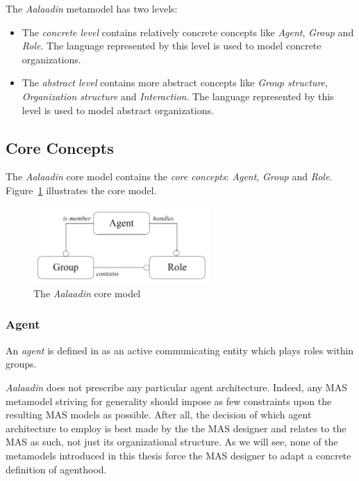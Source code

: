 The \textit{Aalaadin} metamodel has two levels:
\begin{itemize}
	\item The \textit{concrete level} contains relatively concrete concepts like \textit{Agent}, \textit{Group} and \textit{Role}.
	The language represented by this level is used to model concrete organizations.
	\item The \textit{abstract level} contains more abstract concepts like \textit{Group structure}, \textit{Organization structure} and \textit{Interaction}.
	The language represented by this level is used to model abstract organizations.
\end{itemize}

\subsection{Core Concepts}

The \textit{Aalaadin} core model contains the \textit{core concepts}: \textit{Agent}, \textit{Group} and \textit{Role}.
Figure~\ref{figure:aalaadin-core-model} illustrates the core model.

\begin{figure}[h]
	\centering
	\includegraphics[width=0.6\textwidth]{images/aalaadin/core-model.png}
	\caption{The \textit{Aalaadin} core model \cite{Ferber97}}
	\label{figure:aalaadin-core-model}
\end{figure}

\subsubsection*{Agent}

An \textit{agent} is defined in \cite{Ferber97} as an active communicating entity which plays roles within groups.

\textit{Aalaadin} does not prescribe any particular agent architecture.
Indeed, any MAS metamodel striving for generality should impose as few constraints upon the resulting MAS models as possible.
After all, the decision of which agent architecture to employ is best made by the the MAS designer and relates to the MAS as such, not just its organizational structure.
As we will see, none of the metamodels introduced in this thesis force the MAS designer to adapt a concrete definition of agenthood.

